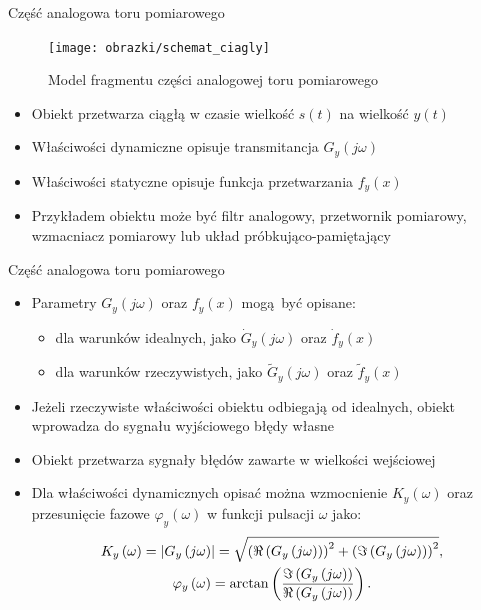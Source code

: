 \documentclass[12pt, polish, aspectratio = 169]{beamer}
\begin{document}
\begin{frame}{Część analogowa toru pomiarowego}
\begin{figure}
\texttt{[image: obrazki/schemat\_ciagly]}
\caption{Model fragmentu części analogowej toru pomiarowego}
\end{figure}
\begin{itemize}
\item Obiekt przetwarza ciągłą w czasie wielkość $s(t)$ na wielkość $y(t)$
\item Właściwości dynamiczne opisuje transmitancja $G_{y}(j\omega)$
\item Właściwości statyczne opisuje funkcja przetwarzania $f_{y}(x)$
\item Przykładem obiektu może być filtr analogowy, przetwornik pomiarowy, wzmacniacz pomiarowy lub układ próbkująco-pamiętający
\end{itemize}
\end{frame}

\begin{frame}{Część analogowa toru pomiarowego}
\begin{itemize}
\item Parametry $G_{y}(j\omega)$ oraz $f_{y}(x)$ mogą być opisane:
	\begin{itemize}
	\item dla warunków idealnych, jako $\dot{G}_{y}(j\omega)$ oraz $\dot{f}_{y}(x)$
	\item dla warunków rzeczywistych, jako $\tilde{G}_{y}(j\omega)$ oraz $\tilde{f}_{y}(x)$
	\end{itemize}
\item Jeżeli rzeczywiste właściwości obiektu odbiegają od idealnych, obiekt wprowadza do sygnału wyjściowego błędy własne
\item Obiekt przetwarza sygnały błędów zawarte w wielkości wejściowej
\item Dla właściwości dynamicznych opisać można wzmocnienie $K_{y}(\omega)$ oraz przesunięcie fazowe $\varphi_{y}(\omega)$ w funkcji pulsacji $\omega$ jako:
\begin{gather}
K_{y} \left(\omega\right) = \left| G_{y} \left(j\omega\right) \right| =
	\sqrt{\left( \Re \left( G_{y} \left(j\omega\right) \right) \right)^{2} +
	\left( \Im \left( G_{y} \left(j\omega\right) \right) \right)^{2}}
\label{eq:mid_cont_amp}, \\
\varphi_{y} \left(\omega\right) = \arctan \left( \frac{\Im \left( G_{y} \left(j\omega\right) \right)}{\Re \left( G_{y} \left(j\omega\right) \right)} \right) \label{eq:mid_cont_phi}.
\end{gather}
\end{itemize}
\end{frame}
\end{document}
